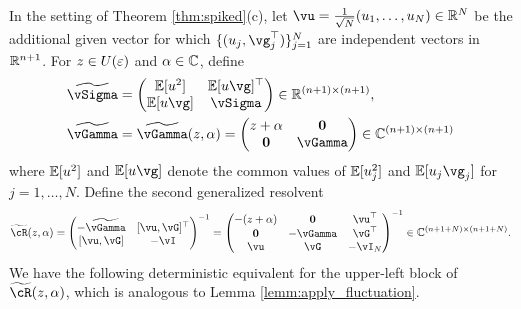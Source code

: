 In the setting of Theorem \ref{thm:spiked}(c), let
$\vu=\frac{1}{\sqrt{N}}(u_1,\ldots,u_N) \in \R^N$ be the
additional given vector for which $\{(u_j,\vg_j^\top)\}_{j=1}^N$ are
independent vectors in $\mathbb{R}^{n+1}$. For $z \in U(\varepsilon)$ and $\alpha \in \mathbb{C}$, define
\begin{align}
\widetilde{\vSigma}&=\begin{pmatrix}
		\E[u^2] & \E[u\vg]^\top\\
		\E[u\vg] & \vSigma
	\end{pmatrix}	\in\R^{(n+1)\times (n+1)}\label{eq:tilde_Sigma},\\
\widetilde \vGamma&=\widetilde \vGamma(z,\alpha)
=\begin{pmatrix} z+\alpha & \mathbf{0} \\
\mathbf{0} & \vGamma \end{pmatrix} \in \C^{(n+1) \times (n+1)}
\nonumber
\end{align}
where $\mathbb{E}[u^2]$ and $\E[u\vg]$ denote the common values of $\mathbb{E}[u_j^2]$ and
$\E[u_j\vg_j]$ for $j=1,\ldots,N$. Define the second generalized resolvent
\begin{equation}\label{eq:tildeR}
\widetilde \vcR(z,\alpha)=
\begin{pmatrix} {-}\widetilde \vGamma & [\vu,\vG]^\top \\
[\vu,\vG] & -\vI \end{pmatrix}^{-1}
=\begin{pmatrix} {-}(z+\alpha) & \mathbf{0} & \vu^\top \\
\mathbf{0} & -\vGamma & \vG^\top \\
\vu & \vG & -\vI_N \end{pmatrix}^{-1}
\in \C^{(n+1+N)\times (n+1+N)}.
\end{equation}
We have the following
deterministic equivalent for the upper-left block of $\widetilde \vcR(z,\alpha)$,
which is analogous to Lemma \ref{lemm:apply_fluctuation}.


